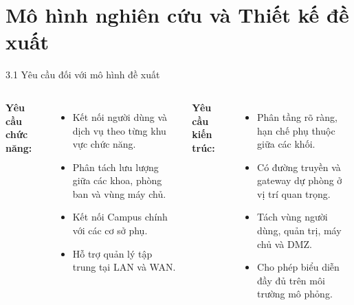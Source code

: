 
\section{Mô hình nghiên cứu và Thiết kế đề xuất}

\begin{frame}{3.1 Yêu cầu đối với mô hình đề xuất}
    \begin{columns}[T]
        \textbf{Yêu cầu chức năng:}
        \begin{itemize}
            \item Kết nối người dùng và dịch vụ theo từng khu vực chức năng.
            \item Phân tách lưu lượng giữa các khoa, phòng ban và vùng máy chủ.
            \item Kết nối Campus chính với các cơ sở phụ.
            \item Hỗ trợ quản lý tập trung tại LAN và WAN.
        \end{itemize}

        \textbf{Yêu cầu kiến trúc:}
        \begin{itemize}
            \item Phân tầng rõ ràng, hạn chế phụ thuộc giữa các khối.
            \item Có đường truyền và gateway dự phòng ở vị trí quan trọng.
            \item Tách vùng người dùng, quản trị, máy chủ và DMZ.
            \item Cho phép biểu diễn đầy đủ trên môi trường mô phỏng.
        \end{itemize}
    \end{columns}
\end{frame}

